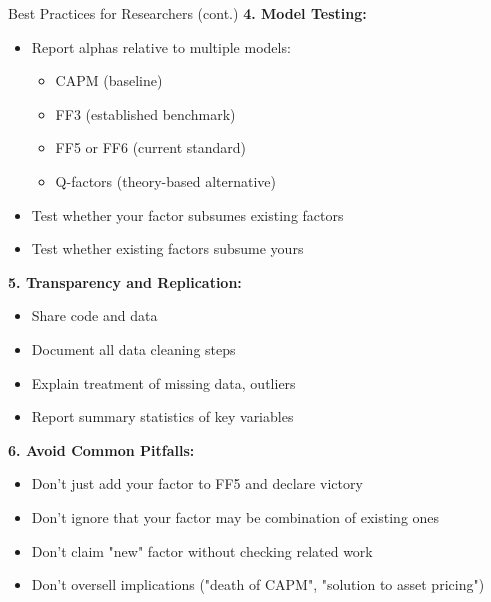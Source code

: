 \documentclass{beamer}
\begin{document}
\begin{frame}{Best Practices for Researchers (cont.)}
    \textbf{4. Model Testing:}
    \begin{itemize}
        \item Report alphas relative to multiple models:
        \begin{itemize}
            \item CAPM (baseline)
            \item FF3 (established benchmark)
            \item FF5 or FF6 (current standard)
            \item Q-factors (theory-based alternative)
        \end{itemize}
        \item Test whether your factor subsumes existing factors
        \item Test whether existing factors subsume yours
    \end{itemize}
    
    
    \textbf{5. Transparency and Replication:}
    \begin{itemize}
        \item Share code and data
        \item Document all data cleaning steps
        \item Explain treatment of missing data, outliers
        \item Report summary statistics of key variables
    \end{itemize}
    
    
    \textbf{6. Avoid Common Pitfalls:}
    \begin{itemize}
        \item Don't just add your factor to FF5 and declare victory
        \item Don't ignore that your factor may be combination of existing ones
        \item Don't claim "new" factor without checking related work
        \item Don't oversell implications ("death of CAPM", "solution to asset pricing")
    \end{itemize}
\end{frame}
\end{document}
